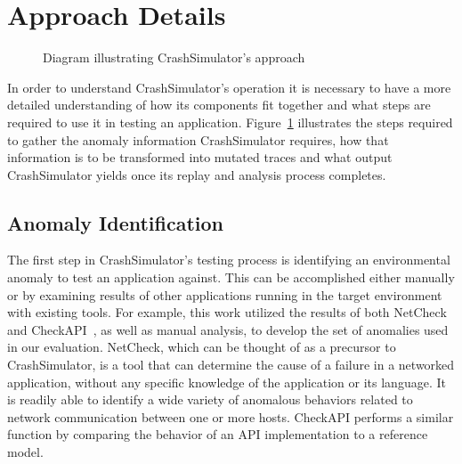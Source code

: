 \section{Approach Details}
\label{SEC:approach}

\begin{figure}[t]
  \center{}
  \caption{Diagram illustrating CrashSimulator's approach}
  \label{figure:approach}
\end{figure}

In order to understand CrashSimulator's operation it is necessary to have a
more detailed understanding of how its components fit together and what
steps are required to use it in testing an application.
Figure~\ref{figure:approach} illustrates the steps required to gather
the anomaly information CrashSimulator requires, how that information is to
be transformed into mutated traces and what output CrashSimulator yields
once its replay and analysis process completes.

\subsection{Anomaly Identification} \label{subsec:anomalyidentification}

The first step in CrashSimulator's testing process is identifying an
environmental anomaly to test an application against.  This can be
accomplished either manually or by examining results of other applications
running in the target environment with existing tools.  For example, this
work utilized the results of both NetCheck~\cite{Zhuang_NSDI_2014} and
CheckAPI~\cite{rasley2015detecting}, as well as manual analysis, to develop
the set of anomalies used in our evaluation.  NetCheck, which can be
thought of as a precursor to CrashSimulator, is a tool that can determine
the cause of a failure in a networked application, without any specific
knowledge of the application or its language. It is readily able to
identify a wide variety of anomalous behaviors related to network
communication between one or more hosts.  CheckAPI performs a similar
function by comparing the behavior of an API implementation to a reference
model.

